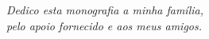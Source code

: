 


\vfill

\begin{flushright}
\hfill \textit{Dedico esta monografia a minha família,\\pelo apoio fornecido e aos meus amigos.\\}
\end{flushright}

\vspace*{1cm}

\clearpage 
